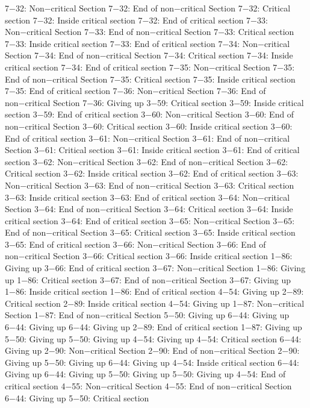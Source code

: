 7−32: Non−critical Section
7−32: End of non−critical Section
7−32: Critical section
7−32: Inside critical section
7−32: End of critical section
7−33: Non−critical Section
7−33: End of non−critical Section
7−33: Critical section
7−33: Inside critical section
7−33: End of critical section
7−34: Non−critical Section
7−34: End of non−critical Section
7−34: Critical section
7−34: Inside critical section
7−34: End of critical section
7−35: Non−critical Section
7−35: End of non−critical Section
7−35: Critical section
7−35: Inside critical section
7−35: End of critical section
7−36: Non−critical Section
7−36: End of non−critical Section
7−36: Giving up
3−59: Critical section
3−59: Inside critical section
3−59: End of critical section
3−60: Non−critical Section
3−60: End of non−critical Section
3−60: Critical section
3−60: Inside critical section
3−60: End of critical section
3−61: Non−critical Section
3−61: End of non−critical Section
3−61: Critical section
3−61: Inside critical section
3−61: End of critical section
3−62: Non−critical Section
3−62: End of non−critical Section
3−62: Critical section
3−62: Inside critical section
3−62: End of critical section
3−63: Non−critical Section
3−63: End of non−critical Section
3−63: Critical section
3−63: Inside critical section
3−63: End of critical section
3−64: Non−critical Section
3−64: End of non−critical Section
3−64: Critical section
3−64: Inside critical section
3−64: End of critical section
3−65: Non−critical Section
3−65: End of non−critical Section
3−65: Critical section
3−65: Inside critical section
3−65: End of critical section
3−66: Non−critical Section
3−66: End of non−critical Section
3−66: Critical section
3−66: Inside critical section
1−86: Giving up
3−66: End of critical section
3−67: Non−critical Section
1−86: Giving up
1−86: Critical section
3−67: End of non−critical Section
3−67: Giving up
1−86: Inside critical section
1−86: End of critical section
4−54: Giving up
2−89: Critical section
2−89: Inside critical section
4−54: Giving up
1−87: Non−critical Section
1−87: End of non−critical Section
5−50: Giving up
6−44: Giving up
6−44: Giving up
6−44: Giving up
2−89: End of critical section
1−87: Giving up
5−50: Giving up
5−50: Giving up
4−54: Giving up
4−54: Critical section
6−44: Giving up
2−90: Non−critical Section
2−90: End of non−critical Section
2−90: Giving up
5−50: Giving up
6−44: Giving up
4−54: Inside critical section
6−44: Giving up
6−44: Giving up
5−50: Giving up
5−50: Giving up
4−54: End of critical section
4−55: Non−critical Section
4−55: End of non−critical Section
6−44: Giving up
5−50: Critical section
